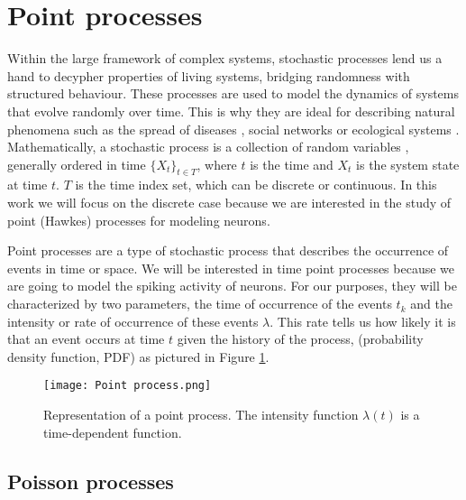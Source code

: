 \section{Point processes} \label{sec:point_processes}
Within the large framework of complex systems, stochastic processes lend us a hand to decypher properties of living systems, bridging randomness with structured behaviour.
These processes are used to model the dynamics of systems that evolve randomly over time. This is why they are ideal for describing natural phenomena such as 
the spread of diseases \cite{Chowell}, social networks \cite{castellano2009statistical} or ecological systems \cite{azaele2016statistical}. Mathematically, a stochastic process
is a collection of random variables \cite{McKane}, generally ordered in time $ \{X_t\}_{t \in T} $, where $t$ is the time and $X_t$ is the system state at time $t$. $T$ is the time index set, 
which can be discrete or continuous. In this work we will focus on the discrete case because we are interested in the study of point (Hawkes) processes for modeling neurons. 

Point processes are a type of stochastic process that describes the occurrence of events in time or space. We will be interested in time point processes because 
we are going to model the spiking activity of neurons. For our purposes, they will be characterized by two parameters, the time of occurrence
of the events $t_k$ and the intensity or rate of occurrence of these events $\lambda$. This rate tells us how likely it is that an event occurs at time $t$ given the history of the process, 
(probability density function, PDF) as pictured in Figure \ref{f:point_process}.

\begin{figure}[H]
    \centering
    \texttt{[image: Point process.png]}
    \caption{Representation of a point process. The intensity function $\lambda(t)$ is a time-dependent function.}
    \label{f:point_process}
\end{figure}

\subsection{Poisson processes} \label{subsec:Poisson_processes}

